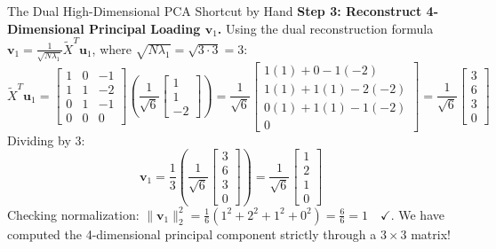\begin{examplebox}{The Dual High-Dimensional PCA Shortcut by Hand}
\textbf{Step 3: Reconstruct 4-Dimensional Principal Loading $\mathbf{v}_1$.}
Using the dual reconstruction formula $\mathbf{v}_1 = \frac{1}{\sqrt{N\lambda_1}} \tilde{X}^T \mathbf{u}_1$, where $\sqrt{N\lambda_1} = \sqrt{3 \cdot 3} = 3$:
\begin{equation}
\tilde{X}^T \mathbf{u}_1 = \begin{bmatrix} 1 & 0 & -1 \\ 1 & 1 & -2 \\ 0 & 1 & -1 \\ 0 & 0 & 0 \end{bmatrix} \left( \frac{1}{\sqrt{6}}\begin{bmatrix} 1 \\ 1 \\ -2 \end{bmatrix} \right) = \frac{1}{\sqrt{6}} \begin{bmatrix} 1(1) + 0 - 1(-2) \\ 1(1) + 1(1) - 2(-2) \\ 0(1) + 1(1) - 1(-2) \\ 0 \end{bmatrix} = \frac{1}{\sqrt{6}} \begin{bmatrix} 3 \\ 6 \\ 3 \\ 0 \end{bmatrix}
\end{equation}
Dividing by $3$:
\begin{equation}
\mathbf{v}_1 = \frac{1}{3} \left( \frac{1}{\sqrt{6}}\begin{bmatrix} 3 \\ 6 \\ 3 \\ 0 \end{bmatrix} \right) = \frac{1}{\sqrt{6}} \begin{bmatrix} 1 \\ 2 \\ 1 \\ 0 \end{bmatrix}
\end{equation}
Checking normalization: $\|\mathbf{v}_1\|_2^2 = \frac{1}{6}(1^2 + 2^2 + 1^2 + 0^2) = \frac{6}{6} = 1 \quad \checkmark$.
We have computed the 4-dimensional principal component strictly through a $3 \times 3$ matrix!
\end{examplebox}

